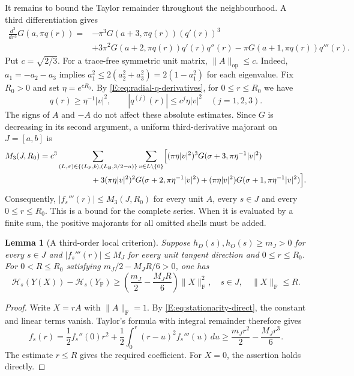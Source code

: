 \documentclass[reqno,english]{amsart}
\newtheorem{lemma}[theorem]{Lemma}
\theoremstyle{definition}
\newtheorem{open problem}[theorem]{Open Problem}
\theoremstyle{remark}
\theoremstyle{plain}
\numberwithin{equation}{section}
\newcommand{\FCC}{L_{\mathrm F}}
\newcommand{\B}{L_{\mathrm B}}
\newcommand{\YF}{Y_{\mathrm F}}
\newcommand{\HH}{\mathcal H}
\newcommand{\norm}[1]{\lVert#1\rVert_{\mathrm F}}
\newcommand{\opnorm}[1]{\lVert#1\rVert_{\mathrm{op}}}
\begin{document}
It remains to bound the Taylor remainder throughout the
neighbourhood. A third differentiation gives
\begin{align}
 \frac{d^3}{dr^3}G(a,\pi q(r))={}&
 -\pi^3G(a+3,\pi q(r))(q'(r))^3\nonumber\\
 &+3\pi^2G(a+2,\pi q(r))q'(r)q''(r)
 -\pi G(a+1,\pi q(r))q'''(r).
 \label{E:eq:third-variation-direct}
\end{align}
Put $c=\sqrt{2/3}$. For a trace-free symmetric unit matrix,
$\opnorm A\le c$. Indeed, $a_1=-a_2-a_3$ implies
$a_1^2\le2(a_2^2+a_3^2)=2(1-a_1^2)$ for each eigenvalue.
Fix $R_0>0$ and set $\eta=e^{cR_0}$. By
\eqref{E:eq:radial-q-derivatives}, for $0\le r\le R_0$ we have
\[
 q(r)\ge\eta^{-1}|v|^2,\qquad
 |q^{(j)}(r)|\le c^j\eta|v|^2\quad(j=1,2,3).
\]
The signs of $A$ and $-A$ do not affect these absolute estimates. Since $G$
is decreasing in its second argument, a uniform third-derivative majorant on
$J=[a,b]$ is
\begin{align}
 M_3(J,R_0)={}&c^3\sum_{(L,\sigma)\in\{(\FCC,b),(\B,3/2-a)\}}
 \sum_{v\in L\setminus\{0\}}
 \Bigl[(\pi\eta|v|^2)^3G(\sigma+3,\pi\eta^{-1}|v|^2)\nonumber\\
 &\hspace{18mm}+3(\pi\eta|v|^2)^2G(\sigma+2,\pi\eta^{-1}|v|^2)
 +(\pi\eta|v|^2)G(\sigma+1,\pi\eta^{-1}|v|^2)\Bigr].
 \label{E:eq:M3-new}
\end{align}
Consequently, $|f_s'''(r)|\le M_3(J,R_0)$ for every unit $A$,
every $s\in J$ and every $0\le r\le R_0$. This is a bound for the
complete series. When it is evaluated by a finite sum, the positive
majorants for all omitted shells must be added.

\begin{lemma}[A third-order local criterion]\label{E:lem:third-criterion}
Suppose $h_D(s),h_O(s)\ge m_J>0$ for every $s\in J$ and
$|f_s'''(r)|\le M_J$ for every unit tangent direction and $0\le r\le R_0$.
For $0<R\le R_0$ satisfying $m_J/2-M_JR/6>0$, one has
\begin{equation}
 \HH_s(Y(X))-\HH_s(\YF)
 \ge\left(\frac{m_J}{2}-\frac{M_JR}{6}\right)\norm X^2,
 \quad s\in J,\quad\norm X\le R.
 \label{E:eq:third-criterion}
\end{equation}
\end{lemma}
\begin{proof}
Write $X=rA$ with $\norm A=1$. By
\eqref{E:eq:stationarity-direct}, the constant and linear terms
vanish. Taylor's formula with integral remainder therefore gives
\[
 f_s(r)=\frac12 f_s''(0)r^2
       +\frac12\int_0^r(r-u)^2f_s'''(u)\,du
 \ge\frac{m_Jr^2}{2}-\frac{M_Jr^3}{6}.
\]
The estimate $r\le R$ gives the required coefficient. For $X=0$,
the assertion holds directly.
\end{proof}
\end{document}

